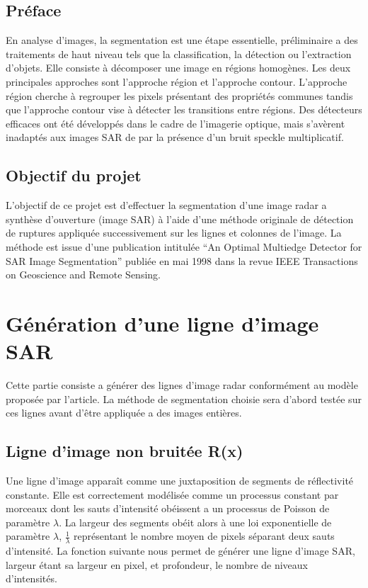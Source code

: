 \documentclass[a4paper,11pt]{article}
\begin{document}
\subsection{Préface}

En analyse d'images, la segmentation est une étape essentielle, préliminaire a des traitements de haut niveau tels que la classification, la détection ou l'extraction d'objets. Elle consiste à décomposer une image en régions homogènes. Les deux principales approches sont l'approche région et l'approche contour. L'approche région cherche à regrouper les pixels présentant des propriétés communes tandis que l'approche contour vise à détecter les transitions entre régions. Des détecteurs efficaces ont été développés dans le cadre de l'imagerie optique, mais s'avèrent inadaptés aux images SAR de par la présence d'un bruit speckle multiplicatif.

\subsection{Objectif du projet}

L'objectif de ce projet est d'effectuer la segmentation d'une image radar a synthèse
d'ouverture (image SAR) à l'aide d'une méthode originale de détection de
ruptures appliquée successivement sur les lignes et colonnes de l'image. La méthode
est issue d'une publication intitulée “An Optimal Multiedge Detector for SAR Image
Segmentation” publiée en mai 1998 dans la revue IEEE Transactions on Geoscience
and Remote Sensing.

\newpage

\section{Génération d'une ligne d'image SAR}

Cette partie consiste a générer des lignes d'image radar conformément au
modèle proposée par l'article. La méthode de segmentation choisie sera
d'abord testée sur ces lignes avant d'être appliquée a des images entières.

\subsection{Ligne d'image non bruitée R(x)}

Une ligne d'image apparaît comme une juxtaposition de segments de réflectivité constante.
Elle est correctement modélisée comme un processus constant par morceaux dont les
sauts d'intensité obéissent a un processus de Poisson de paramètre $\lambda$. La
largeur des segments obéit alors à une loi exponentielle de paramètre $\lambda$, $\frac{1}{\lambda}$ représentant
le nombre moyen de pixels séparant deux sauts d'intensité. La fonction suivante
nous permet de générer une ligne d'image SAR, \textrm{largeur} étant sa largeur
en pixel, et \textrm{profondeur}, le nombre de niveaux d'intensités.
\end{document}
